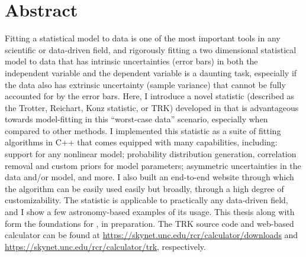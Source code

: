 

\chapter*{Abstract}
\label{cha:section_abstract}
Fitting a statistical model to data is one of the most important tools in any scientific or data-driven field, and rigorously fitting a two dimensional statistical model to data that has intrinsic uncertainties (error bars) in both the independent variable and the dependent variable is a daunting task, especially if the data also has extrinsic uncertainty (sample variance) that cannot be fully accounted for by the error bars. Here, I introduce a novel statistic (described as the Trotter, Reichart, Konz statistic, or TRK) developed in \textcite{trotter} that is advantageous towards model-fitting in this ``worst-case data'' scenario, especially when compared to other methods. I implemented this statistic as a suite of fitting algorithms in C++ that comes equipped with many capabilities, including: support for any nonlinear model; probability distribution generation, correlation removal and custom priors for model parameters; asymmetric uncertainties in the data and/or model, and more. I also built an end-to-end website through which the algorithm can be easily used easily but broadly, through a high degree of customizability. The statistic is applicable to practically any data-driven field, and I show a few astronomy-based examples of its usage. This thesis along with \textcite{trotter} form the foundations for \textcite{TRKIapjs}, in preparation. The TRK source code and web-based calculator can be found at \url{https://skynet.unc.edu/rcr/calculator/downloads} and \url{https://skynet.unc.edu/rcr/calculator/trk}, respectively.

